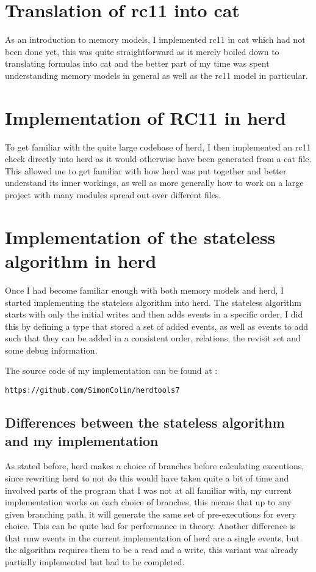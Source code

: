 \documentclass[a4,12pt]{article}
\begin{document}
\section{Translation of rc11 into cat}

As an introduction to memory models, I implemented rc11 in cat which had not been done yet, this was quite straightforward as it merely boiled down to translating formulas into cat and the better part of my time was spent understanding memory models in general as well as the rc11 model in particular.

\section{Implementation of RC11 in herd}

To get familiar with the quite large codebase of herd, I then implemented an rc11 check directly into herd as it would otherwise have been generated from a cat file. This allowed me to get familiar with how herd was put together and better understand its inner workings, as well as more generally how to work on a large project with many modules spread out over different files.

\section{Implementation of the stateless algorithm in herd}

Once I had become familiar enough with both memory models and herd, I started implementing the stateless algorithm into herd. The stateless algorithm starts with only the initial writes and then adds events in a specific order, I did this by defining a type that stored a set of added events, as well as events to add such that they can be added in a consistent order, relations, the revisit set and some debug information.

The source code of my implementation can be found at :
\begin{lstlisting}
https://github.com/SimonColin/herdtools7
\end{lstlisting}

\subsection{Differences between the stateless algorithm and my implementation}

As stated before, herd makes a choice of branches before calculating executions, since rewriting herd to not do this would have taken quite a bit of time and involved parts of the program that I was not at all familiar with, my current implementation works on each choice of branches, this means that up to any given branching path, it will generate the same set of pre-executions for every choice. This can be quite bad for performance in theory. Another difference is that rmw events in the current implementation of herd are a single events, but the algorithm requires them to be a read and a write, this variant was already partially implemented but had to be completed.
\end{document}
